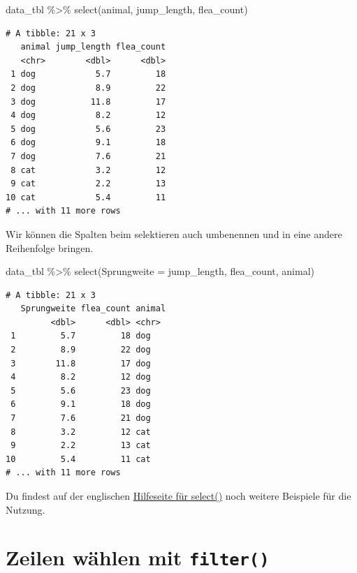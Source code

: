 \documentclass[
  letterpaper,
]{scrbook}
\newenvironment{Shaded}{\begin{snugshade}}{\end{snugshade}}
\newcommand{\AttributeTok}[1]{\textcolor[rgb]{0.40,0.45,0.13}{#1}}
\newcommand{\FunctionTok}[1]{\textcolor[rgb]{0.28,0.35,0.67}{#1}}
\newcommand{\NormalTok}[1]{\textcolor[rgb]{0.00,0.23,0.31}{#1}}
\newcommand{\SpecialCharTok}[1]{\textcolor[rgb]{0.37,0.37,0.37}{#1}}
\begin{document}
\begin{Shaded}
\begin{Highlighting}[]
\NormalTok{data\_tbl }\SpecialCharTok{\%\textgreater{}\%} 
  \FunctionTok{select}\NormalTok{(animal, jump\_length, flea\_count)}
\end{Highlighting}
\end{Shaded}

\begin{verbatim}
# A tibble: 21 x 3
   animal jump_length flea_count
   <chr>        <dbl>      <dbl>
 1 dog            5.7         18
 2 dog            8.9         22
 3 dog           11.8         17
 4 dog            8.2         12
 5 dog            5.6         23
 6 dog            9.1         18
 7 dog            7.6         21
 8 cat            3.2         12
 9 cat            2.2         13
10 cat            5.4         11
# ... with 11 more rows
\end{verbatim}

Wir können die Spalten beim selektieren auch umbenennen und in eine
andere Reihenfolge bringen.

\begin{Shaded}
\begin{Highlighting}[]
\NormalTok{data\_tbl }\SpecialCharTok{\%\textgreater{}\%} 
  \FunctionTok{select}\NormalTok{(}\AttributeTok{Sprungweite =}\NormalTok{ jump\_length, flea\_count, animal)}
\end{Highlighting}
\end{Shaded}

\begin{verbatim}
# A tibble: 21 x 3
   Sprungweite flea_count animal
         <dbl>      <dbl> <chr> 
 1         5.7         18 dog   
 2         8.9         22 dog   
 3        11.8         17 dog   
 4         8.2         12 dog   
 5         5.6         23 dog   
 6         9.1         18 dog   
 7         7.6         21 dog   
 8         3.2         12 cat   
 9         2.2         13 cat   
10         5.4         11 cat   
# ... with 11 more rows
\end{verbatim}

Du findest auf der englischen
\href{https://dplyr.tidyverse.org/reference/select.html}{Hilfeseite für
select()} noch weitere Beispiele für die Nutzung.

\hypertarget{zeilen-wuxe4hlen-mit-filter}{%
\section{\texorpdfstring{Zeilen wählen mit
\texttt{filter()}}{Zeilen wählen mit filter()}}\label{zeilen-wuxe4hlen-mit-filter}}
\end{document}
